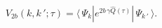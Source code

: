 \begin{equation}\label{V(k,k)}
V_{2b}(k,k\,';\tau)=\langle\,\Psi_k |e^{2b\,\gamma\hat Q(\tau)}
|\,\Psi_{k\,'}\,\rangle.
\end{equation}

